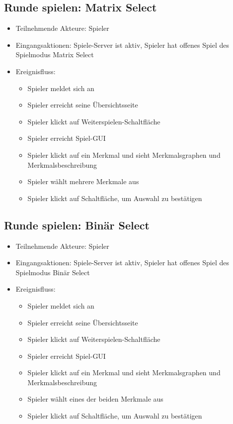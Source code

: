 \documentclass[a4paper]{scrreprt}
\begin{document}
   
    \subsection{Runde spielen: Matrix Select}
    \begin{itemize}
    	\item Teilnehmende Akteure: \Gls{Spieler}
    	\item Eingangsaktionen: Spiele-Server ist aktiv, Spieler hat offenes Spiel des Spielmodus Matrix Select
    	\item Ereignisfluss:
    	\begin{itemize}
    		\item Spieler meldet sich an
    		\item Spieler erreicht seine Übersichtsseite
    		\item Spieler klickt auf Weiterspielen-Schaltfläche
    		\item Spieler erreicht Spiel-GUI
    		\item Spieler klickt auf ein Merkmal und sieht Merkmalsgraphen und Merkmalsbeschreibung
    		\item Spieler wählt mehrere Merkmale aus
    		\item Spieler klickt auf Schaltfläche, um Auswahl zu bestätigen 
    	\end{itemize}
    \end{itemize}
	
	\subsection{Runde spielen: Binär Select}
	\begin{itemize}
		\item Teilnehmende Akteure: \Gls{Spieler}
		\item Eingangsaktionen: Spiele-Server ist aktiv, Spieler hat offenes Spiel des Spielmodus Binär Select
		\item Ereignisfluss:
		\begin{itemize}
			\item Spieler meldet sich an
			\item Spieler erreicht seine Übersichtsseite
			\item Spieler klickt auf Weiterspielen-Schaltfläche
			\item Spieler erreicht Spiel-GUI
			\item Spieler klickt auf ein Merkmal und sieht Merkmalsgraphen und Merkmalsbeschreibung
			\item Spieler wählt eines der beiden Merkmale aus
			\item Spieler klickt auf Schaltfläche, um Auswahl zu bestätigen 
		\end{itemize}
	\end{itemize}
\end{document}
